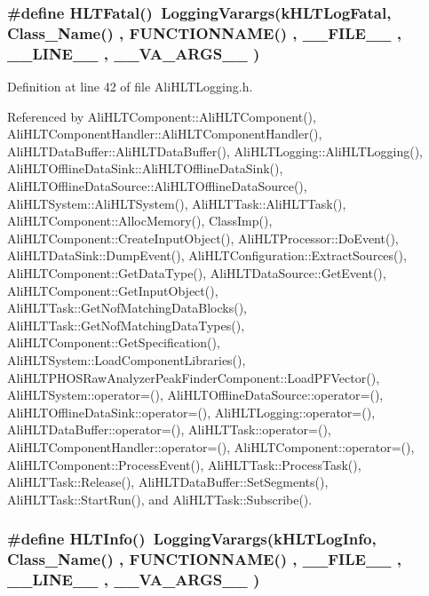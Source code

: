 \subsubsection{\setlength{\rightskip}{0pt plus 5cm}\#define HLTFatal()\ Logging\-Varargs(k\-HLTLog\-Fatal,     Class\_\-Name() , FUNCTIONNAME() , \_\-\_\-FILE\_\-\_\- , \_\-\_\-LINE\_\-\_\- , \_\-\_\-VA\_\-ARGS\_\-\_\- )}\label{AliHLTLogging_8h_a7}




Definition at line 42 of file Ali\-HLTLogging.h.

Referenced by Ali\-HLTComponent::Ali\-HLTComponent(), Ali\-HLTComponent\-Handler::Ali\-HLTComponent\-Handler(), Ali\-HLTData\-Buffer::Ali\-HLTData\-Buffer(), Ali\-HLTLogging::Ali\-HLTLogging(), Ali\-HLTOffline\-Data\-Sink::Ali\-HLTOffline\-Data\-Sink(), Ali\-HLTOffline\-Data\-Source::Ali\-HLTOffline\-Data\-Source(), Ali\-HLTSystem::Ali\-HLTSystem(), Ali\-HLTTask::Ali\-HLTTask(), Ali\-HLTComponent::Alloc\-Memory(), Class\-Imp(), Ali\-HLTComponent::Create\-Input\-Object(), Ali\-HLTProcessor::Do\-Event(), Ali\-HLTData\-Sink::Dump\-Event(), Ali\-HLTConfiguration::Extract\-Sources(), Ali\-HLTComponent::Get\-Data\-Type(), Ali\-HLTData\-Source::Get\-Event(), Ali\-HLTComponent::Get\-Input\-Object(), Ali\-HLTTask::Get\-Nof\-Matching\-Data\-Blocks(), Ali\-HLTTask::Get\-Nof\-Matching\-Data\-Types(), Ali\-HLTComponent::Get\-Specification(), Ali\-HLTSystem::Load\-Component\-Libraries(), Ali\-HLTPHOSRaw\-Analyzer\-Peak\-Finder\-Component::Load\-PFVector(), Ali\-HLTSystem::operator=(), Ali\-HLTOffline\-Data\-Source::operator=(), Ali\-HLTOffline\-Data\-Sink::operator=(), Ali\-HLTLogging::operator=(), Ali\-HLTData\-Buffer::operator=(), Ali\-HLTTask::operator=(), Ali\-HLTComponent\-Handler::operator=(), Ali\-HLTComponent::operator=(), Ali\-HLTComponent::Process\-Event(), Ali\-HLTTask::Process\-Task(), Ali\-HLTTask::Release(), Ali\-HLTData\-Buffer::Set\-Segments(), Ali\-HLTTask::Start\-Run(), and Ali\-HLTTask::Subscribe().
\subsubsection{\setlength{\rightskip}{0pt plus 5cm}\#define HLTInfo()\ Logging\-Varargs(k\-HLTLog\-Info,      Class\_\-Name() , FUNCTIONNAME() , \_\-\_\-FILE\_\-\_\- , \_\-\_\-LINE\_\-\_\- , \_\-\_\-VA\_\-ARGS\_\-\_\- )}\label{AliHLTLogging_8h_a4}




